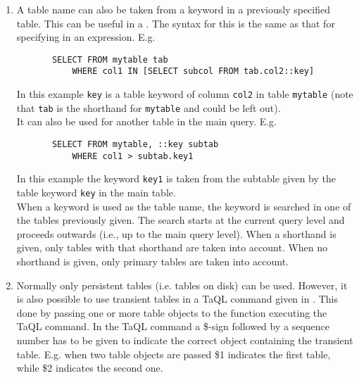 \begin{description}
\begin{enumerate}
       \item
       A table name can also be taken from a keyword in a previously
       specified table. This can be useful in a
       . The syntax for this is
       the same as that for specifying 
       in an expression. E.g.
       \begin{verbatim}
       SELECT FROM mytable tab
           WHERE col1 IN [SELECT subcol FROM tab.col2::key]
       \end{verbatim}
       In this example \texttt{key} is a table keyword of column
       \texttt{col2} in table \texttt{mytable} (note that \texttt{tab}
       is the shorthand for \texttt{mytable} and could be left out).
       \\It can also be used for another table in the main query. E.g.
       \begin{verbatim}
       SELECT FROM mytable, ::key subtab
           WHERE col1 > subtab.key1
       \end{verbatim}
       In this example the keyword \texttt{key1} is taken from the
       subtable given by the table keyword \texttt{key} in the main
       table.
       \\When a keyword is used as the table name, the keyword is
       searched
       in one of the tables previously given. The search starts at
       the current query level and proceeds outwards (i.e., up to the
       main query level). When a shorthand is given, only tables with
       that shorthand are taken into account. When no shorthand is
       given, only primary tables are taken into account.

       \item
       Normally only persistent tables (i.e. tables on disk) can
       be used. However, it is also possible to use transient tables
       in a TaQL command given in .
       This done by passing one or more  table objects to the
       function executing the TaQL command. In the TaQL command a
       \$-sign followed by a sequence number has to be given to
       indicate the correct object containing the transient table.
       E.g. when two
       table objects are passed \$1 indicates the first table, while \$2
       indicates the second one.
     \end{enumerate}


\end{description}
